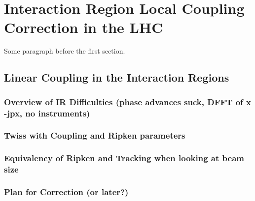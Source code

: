 
\chapter{Interaction Region Local Coupling Correction in the LHC} %

\label{Chapter3} %




Some paragraph before the first section.


\section{Linear Coupling in the Interaction Regions}

\subsection{Overview of IR Difficulties (phase advances suck, DFFT of x -jpx, no instruments)}

\subsection{Twiss with Coupling and Ripken parameters}

\subsection{Equivalency of Ripken and Tracking when looking at beam size}

\subsection{Plan for Correction (or later?)}


